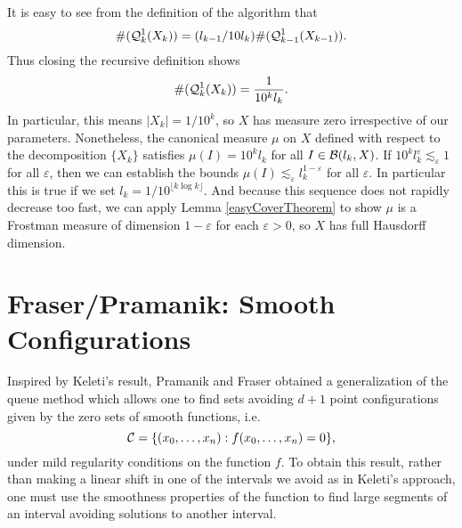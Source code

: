 It is easy to see from the definition of the algorithm that
%
\[ \# (\operatorname{\mathcal{Q}}_k^1(X_k)) = (l_{k-1}/10l_k) \#(\operatorname{\mathcal{Q}}_{k-1}^1(X_{k-1})). \]
%
Thus closing the recursive definition shows
%
\[ \#(\operatorname{\mathcal{Q}}_k^1(X_k)) = \frac{1}{10^k l_k}. \]
%
In particular, this means $|X_k| = 1/10^k$, so $X$ has measure zero irrespective of our parameters. Nonetheless, the canonical measure $\mu$ on $X$ defined with respect to the decomposition $\{ X_k \}$ satisfies $\mu(I) = 10^k l_k$ for all $I \in \operatorname{\mathcal{B}}(l_k,X)$. If $10^k l_k^\varepsilon \lesssim_\varepsilon 1$ for all $\varepsilon$, then we can establish the bounds $\mu(I) \lesssim_\varepsilon l_k^{1-\varepsilon}$ for all $\varepsilon$. In particular this is true if we set $l_k = 1/10^{\lfloor k \log k \rfloor}$. And because this sequence does not rapidly decrease too fast, we can apply Lemma \ref{easyCoverTheorem} to show $\mu$ is a Frostman measure of dimension $1-\varepsilon$ for each $\varepsilon > 0$, so $X$ has full Hausdorff dimension.







\section{Fraser/Pramanik: Smooth Configurations}

Inspired by Keleti's result, Pramanik and Fraser obtained a generalization of the queue method which allows one to find sets avoiding $d+1$ point configurations given by the zero sets of smooth functions, i.e.
%
\[ \operatorname{\mathcal{C}} = \{ (x_0, \dots, x_n) : f(x_0, \dots, x_n) = 0 \}, \]
%
under mild regularity conditions on the function $f$. To obtain this result, rather than making a linear shift in one of the intervals we avoid as in Keleti's approach, one must use the smoothness properties of the function to find large segments of an interval avoiding solutions to another interval.

